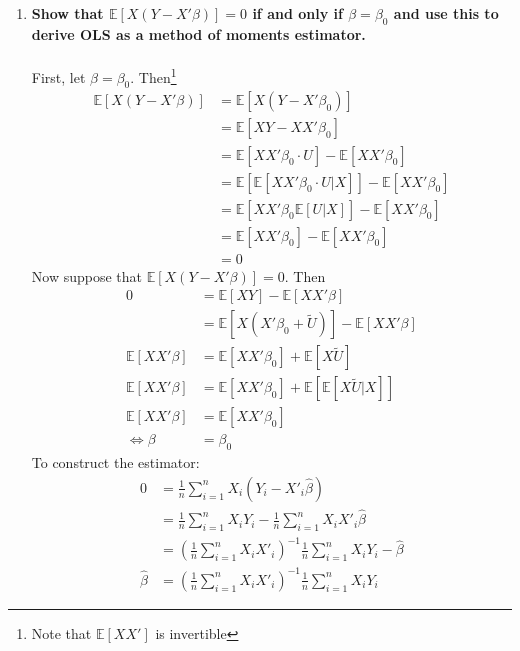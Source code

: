 \documentclass[]{article}
\newcommand{\sumin}{\sum\limits_{i=1}^n} %
\newcommand{\E}{\mathbb{E}}
\begin{document}
\begin{enumerate}[label = (\roman*)]
\item \textbf{Show that   $\E[X(Y - X'\beta)] = 0$ if and only if $\beta = \beta_0$ and use this to derive OLS as a method of moments estimator.} \\
\\
First, let $\beta = \beta_0$. Then\footnote{Note that $\E[XX']$ is invertible} 
\begin{align*}
\E[X(Y - X'\beta)] & = \E[X(Y - X'\beta_0)] \\
& = \E[XY - XX'\beta_0] \\
& = \E[XX'\beta_0\cdot U] - \E[XX'\beta_0]  \\
& = \E[\E[XX'\beta_0\cdot U|X]] - \E[XX'\beta_0] \\
& = \E[XX'\beta_0\E[U|X]] - \E[XX'\beta_0]\\
& = \E[XX'\beta_0] - \E[XX'\beta_0] \\
& = 0 
\end{align*}
Now suppose that $\E[X(Y - X'\beta)] = 0$. Then
\begin{align*}
0 & = \E[XY] - \E[XX'\beta] \\
& =  \E[X(X'\beta_0 +\tilde{ U})] - \E[XX'\beta] \\
\E[XX'\beta] & = \E[XX'\beta_0] + \E[X\tilde{U}] \\
\E[XX'\beta] & = \E[XX'\beta_0] + \E[\E[X\tilde{U}|X]] \\
\E[XX'\beta] & = \E[XX'\beta_0] \\
\iff \beta & = \beta_0
\end{align*}
To construct the estimator:
\begin{align*}
0 & =\frac{1}{n}\sumin X_i(Y_i-X'_i\hat{\beta})
\\
& = \frac{1}{n}\sumin X_iY_i -\frac{1}{n}\sumin X_iX'_i\hat{\beta}
\\
& = \left(\frac{1}{n}\sumin X_iX'_i\right)^{-1} \frac{1}{n}\sumin X_iY_i -\hat{\beta}
\\
\hat{\beta} & = \left(\frac{1}{n}\sumin X_iX'_i\right)^{-1} \frac{1}{n}\sumin X_iY_i
\end{align*} 



\end{enumerate}
\end{document}
